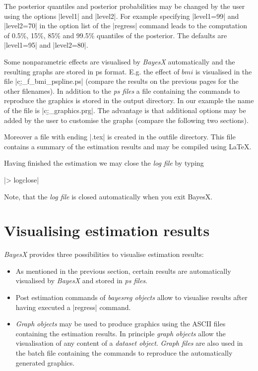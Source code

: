 \documentclass[a4paper]{article}
\begin{document}
The posterior quantiles and posterior probabilities may be changed by the user using the options |level1| and |level2|. For
example specifying |level1=99| and |level2=70| in the option list of the |regress| command leads to the computation of 0.5\%,
15\%, 85\% and 99.5\% quantiles of the posterior. The defaults are |level1=95| and |level2=80|.

Some nonparametric effects are visualised by {\em BayesX} automatically and the resulting graphs are stored in ps format. E.g.
the effect of $bmi$ is visualised in the file |c:\data\b_f_bmi_pspline.ps| (compare the results on the previous pages for the
other filenames). In addition to the {\em ps files} a file containing the commands to reproduce the graphics is stored in the
output directory. In our example the name of the file is |c:\data\b_graphics.prg|. The advantage is that additional options may
be added by the user to customise the graphs (compare the following two sections).

Moreover a file with ending |.tex| is created in the outfile directory. This file contains a summary of the estimation results
and may be compiled using \LaTeX.

Having finished the estimation we may close the {\it log file} by
typing

|> logclose|

Note, that the {\it log file} is closed automatically when you
exit BayesX.

\section{Visualising estimation results}\label{visual}

{\em BayesX} provides three possibilities to visualise estimation
results:
\begin{itemize}
\item As mentioned in the previous section, certain results are
automatically visualised by {\em BayesX} and stored in {\it ps
files}.
\item Post estimation commands of {\em bayesreg objects} allow to visualise results after having executed a |regress|
    command.
\item {\em Graph objects} may be used to produce graphics using the ASCII files containing the estimation results.
In principle {\em graph objects} allow the visualisation of any
content of a {\em dataset object}. {\em Graph files} are also used
in the batch file containing the commands to reproduce the
automatically generated graphics.
\end{itemize}
\end{document}
